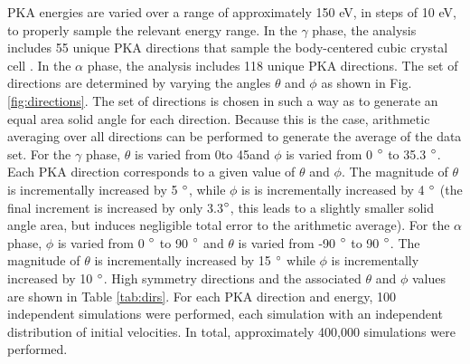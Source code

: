 \documentclass[review]{elsarticle}
\providecommand{\DIFaddtex}[1]{{\protect\color{blue} \sf #1}} %
\providecommand{\DIFaddbegin}{} %
\providecommand{\DIFaddend}{} %
\providecommand{\DIFdelbegin}{} %
\providecommand{\DIFdelend}{} %
\providecommand{\DIFadd}[1]{\texorpdfstring{\DIFaddtex{#1}}{#1}} %
\newcommand{\DIFscaledelfig}{0.5}
\newlength{\DIFdelgraphicswidth} %
\newlength{\DIFdelgraphicsheight} %
\newcommand{\DIFaddincludegraphics}[2][]{{\color{blue}\fbox{\DIFOincludegraphics[#1]{#2}}}} %
\newcommand{\DIFdelincludegraphics}[2][]{%
\sbox{\DIFdelgraphicsbox}{\DIFOincludegraphics[#1]{#2}}%
\settoboxwidth{\DIFdelgraphicswidth}{\DIFdelgraphicsbox} %
\settoboxtotalheight{\DIFdelgraphicsheight}{\DIFdelgraphicsbox} %
\scalebox{\DIFscaledelfig}{%
\parbox[b]{\DIFdelgraphicswidth}{\usebox{\DIFdelgraphicsbox}\\[-\baselineskip] \rule{\DIFdelgraphicswidth}{0em}}\llap{\resizebox{\DIFdelgraphicswidth}{\DIFdelgraphicsheight}{%
\setlength{\unitlength}{\DIFdelgraphicswidth}%
\begin{picture}(1,1)%
\thicklines\linethickness{2pt} %
{\color[rgb]{1,0,0}\put(0,0){\framebox(1,1){}}}%
{\color[rgb]{1,0,0}\put(0,0){\line( 1,1){1}}}%
{\color[rgb]{1,0,0}\put(0,1){\line(1,-1){1}}}%
\end{picture}%
}\hspace*{3pt}}} %
} %
\DeclareRobustCommand{\DIFaddbegin}{\DIFOaddbegin \let\includegraphics\DIFaddincludegraphics} %
\DeclareRobustCommand{\DIFaddend}{\DIFOaddend \let\includegraphics\DIFOincludegraphics} %
\DeclareRobustCommand{\DIFdelbegin}{\DIFOdelbegin \let\includegraphics\DIFdelincludegraphics} %
\DeclareRobustCommand{\DIFdelend}{\DIFOaddend \let\includegraphics\DIFOincludegraphics} %
\begin{document}
PKA energies are varied over a range of approximately 150 eV, in steps of 10 eV, to properly sample the relevant energy range. In the $\gamma$ phase, the analysis includes 55 unique PKA directions that sample the body-centered cubic crystal cell \cite{beeler2015}. In the $\alpha$ phase, the analysis includes 118 unique PKA directions. The set of directions are determined by varying the angles $\theta$ and $\phi$ as shown in Fig. \ref{fig:directions}. \DIFaddbegin \DIFadd{The set of directions is chosen in such a way as to generate an equal area solid angle for each direction. Because this is the case, arithmetic averaging over all directions can be performed to generate the average of the data set. }\DIFaddend For the $\gamma$ phase, $\theta$ is varied from 0\degree to 45\degree and $\phi$ is varied from 0\DIFdelbegin %
\DIFdelend \DIFaddbegin \DIFadd{$\degree$ }\DIFaddend to 35.3\DIFdelbegin %
\DIFdelend \DIFaddbegin \DIFadd{$\degree$}\DIFaddend . Each PKA direction corresponds to a given value of $\theta$ and $\phi$. The magnitude of $\theta$ is incrementally increased by 5\DIFdelbegin %
\DIFdelend \DIFaddbegin \DIFadd{$\degree$}\DIFaddend , while $\phi$ is is incrementally increased by 4\DIFdelbegin %
\DIFdelend \DIFaddbegin \DIFadd{$\degree$ (the final increment is increased by only 3.3$\degree$, this leads to a slightly smaller solid angle area, but induces negligible total error to the arithmetic average)}\DIFaddend . For the $\alpha$ phase, $\phi$ is varied from 0\DIFdelbegin %
\DIFdelend \DIFaddbegin \DIFadd{$\degree$ }\DIFaddend to 90\DIFdelbegin %
\DIFdelend \DIFaddbegin \DIFadd{$\degree$ }\DIFaddend and $\theta$ is varied from -90\DIFdelbegin %
\DIFdelend \DIFaddbegin \DIFadd{$\degree$ }\DIFaddend to 90\DIFdelbegin %
\DIFdelend \DIFaddbegin \DIFadd{$\degree$}\DIFaddend . The magnitude of $\theta$ is incrementally increased by 15\DIFdelbegin %
\DIFdelend \DIFaddbegin \DIFadd{$\degree$  }\DIFaddend while $\phi$ is incrementally increased by 10\DIFdelbegin %
\DIFdelend \DIFaddbegin \DIFadd{$\degree$}\DIFaddend . High symmetry directions and the associated $\theta$ and $\phi$ values are shown in Table \ref{tab:dirs}. For each PKA direction and energy, 100 independent simulations were performed, each simulation with an independent distribution of initial velocities. In total, approximately 400,000 simulations were performed. 
\end{document}
